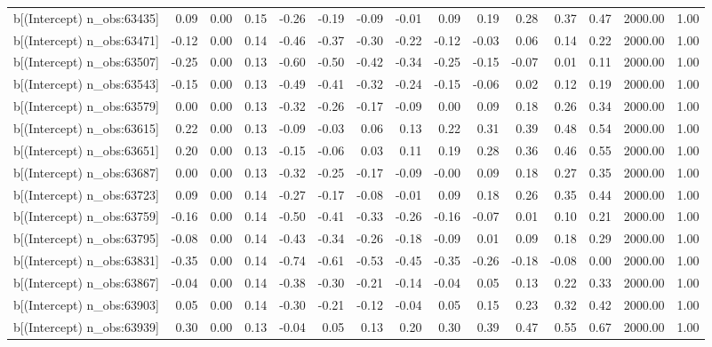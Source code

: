 \begin{table}[ht]
\begin{tabular}{rrrrrrrrrrrrrrr}
  b[(Intercept) n\_obs:63435] & 0.09 & 0.00 & 0.15 & -0.26 & -0.19 & -0.09 & -0.01 & 0.09 & 0.19 & 0.28 & 0.37 & 0.47 & 2000.00 & 1.00 \\ 
  b[(Intercept) n\_obs:63471] & -0.12 & 0.00 & 0.14 & -0.46 & -0.37 & -0.30 & -0.22 & -0.12 & -0.03 & 0.06 & 0.14 & 0.22 & 2000.00 & 1.00 \\ 
  b[(Intercept) n\_obs:63507] & -0.25 & 0.00 & 0.13 & -0.60 & -0.50 & -0.42 & -0.34 & -0.25 & -0.15 & -0.07 & 0.01 & 0.11 & 2000.00 & 1.00 \\ 
  b[(Intercept) n\_obs:63543] & -0.15 & 0.00 & 0.13 & -0.49 & -0.41 & -0.32 & -0.24 & -0.15 & -0.06 & 0.02 & 0.12 & 0.19 & 2000.00 & 1.00 \\ 
  b[(Intercept) n\_obs:63579] & 0.00 & 0.00 & 0.13 & -0.32 & -0.26 & -0.17 & -0.09 & 0.00 & 0.09 & 0.18 & 0.26 & 0.34 & 2000.00 & 1.00 \\ 
  b[(Intercept) n\_obs:63615] & 0.22 & 0.00 & 0.13 & -0.09 & -0.03 & 0.06 & 0.13 & 0.22 & 0.31 & 0.39 & 0.48 & 0.54 & 2000.00 & 1.00 \\ 
  b[(Intercept) n\_obs:63651] & 0.20 & 0.00 & 0.13 & -0.15 & -0.06 & 0.03 & 0.11 & 0.19 & 0.28 & 0.36 & 0.46 & 0.55 & 2000.00 & 1.00 \\ 
  b[(Intercept) n\_obs:63687] & 0.00 & 0.00 & 0.13 & -0.32 & -0.25 & -0.17 & -0.09 & -0.00 & 0.09 & 0.18 & 0.27 & 0.35 & 2000.00 & 1.00 \\ 
  b[(Intercept) n\_obs:63723] & 0.09 & 0.00 & 0.14 & -0.27 & -0.17 & -0.08 & -0.01 & 0.09 & 0.18 & 0.26 & 0.35 & 0.44 & 2000.00 & 1.00 \\ 
  b[(Intercept) n\_obs:63759] & -0.16 & 0.00 & 0.14 & -0.50 & -0.41 & -0.33 & -0.26 & -0.16 & -0.07 & 0.01 & 0.10 & 0.21 & 2000.00 & 1.00 \\ 
  b[(Intercept) n\_obs:63795] & -0.08 & 0.00 & 0.14 & -0.43 & -0.34 & -0.26 & -0.18 & -0.09 & 0.01 & 0.09 & 0.18 & 0.29 & 2000.00 & 1.00 \\ 
  b[(Intercept) n\_obs:63831] & -0.35 & 0.00 & 0.14 & -0.74 & -0.61 & -0.53 & -0.45 & -0.35 & -0.26 & -0.18 & -0.08 & 0.00 & 2000.00 & 1.00 \\ 
  b[(Intercept) n\_obs:63867] & -0.04 & 0.00 & 0.14 & -0.38 & -0.30 & -0.21 & -0.14 & -0.04 & 0.05 & 0.13 & 0.22 & 0.33 & 2000.00 & 1.00 \\ 
  b[(Intercept) n\_obs:63903] & 0.05 & 0.00 & 0.14 & -0.30 & -0.21 & -0.12 & -0.04 & 0.05 & 0.15 & 0.23 & 0.32 & 0.42 & 2000.00 & 1.00 \\ 
  b[(Intercept) n\_obs:63939] & 0.30 & 0.00 & 0.13 & -0.04 & 0.05 & 0.13 & 0.20 & 0.30 & 0.39 & 0.47 & 0.55 & 0.67 & 2000.00 & 1.00 \\ 

\end{tabular}
\end{table}
